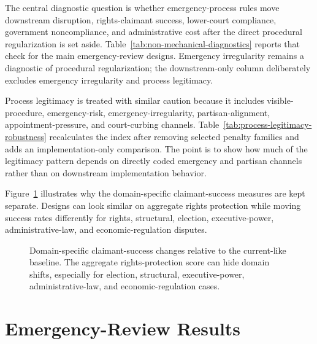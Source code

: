 \documentclass[
    journal=jlc,
    manuscript=research-article,
    year=2026,
  ]{cup-journal}
\providecommand{\Description}[1]{}
\begin{document}
The central diagnostic question is whether emergency-process rules move downstream disruption, rights-claimant success, lower-court compliance, government noncompliance, and administrative cost after the direct procedural regularization is set aside. Table~\ref{tab:non-mechanical-diagnostics} reports that check for the main emergency-review designs. Emergency irregularity remains a diagnostic of procedural regularization; the downstream-only column deliberately excludes emergency irregularity and process legitimacy.



Process legitimacy is treated with similar caution because it includes visible-procedure, emergency-risk, emergency-irregularity, partisan-alignment, appointment-pressure, and court-curbing channels. Table~\ref{tab:process-legitimacy-robustness} recalculates the index after removing selected penalty families and adds an implementation-only comparison. The point is to show how much of the legitimacy pattern depends on directly coded emergency and partisan channels rather than on downstream implementation behavior.



Figure~\ref{fig:domain-claimant-success} illustrates why the domain-specific claimant-success measures are kept separate. Designs can look similar on aggregate rights protection while moving success rates differently for rights, structural, election, executive-power, administrative-law, and economic-regulation disputes.

\begin{figure}[hbt!]
\centering

\caption{Domain-specific claimant-success changes relative to the current-like baseline. The aggregate rights-protection score can hide domain shifts, especially for election, structural, executive-power, administrative-law, and economic-regulation cases.}
\Description{Heatmap comparing claimant-success changes from the current-like baseline by legal domain across selected court designs.}
\label{fig:domain-claimant-success}
\end{figure}

\section{Emergency-Review Results}
\end{document}
